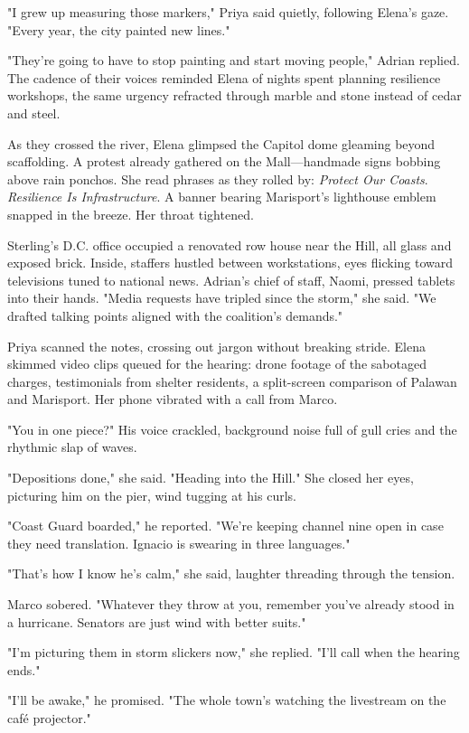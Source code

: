 "I grew up measuring those markers," Priya said quietly, following Elena's gaze. "Every year, the city painted new lines."

"They're going to have to stop painting and start moving people," Adrian replied. The cadence of their voices reminded Elena of nights spent planning resilience workshops, the same urgency refracted through marble and stone instead of cedar and steel.

As they crossed the river, Elena glimpsed the Capitol dome gleaming beyond scaffolding. A protest already gathered on the Mall—handmade signs bobbing above rain ponchos. She read phrases as they rolled by: \textit{Protect Our Coasts}. \textit{Resilience Is Infrastructure}. A banner bearing Marisport's lighthouse emblem snapped in the breeze. Her throat tightened.

Sterling's D.C. office occupied a renovated row house near the Hill, all glass and exposed brick. Inside, staffers hustled between workstations, eyes flicking toward televisions tuned to national news. Adrian's chief of staff, Naomi, pressed tablets into their hands. "Media requests have tripled since the storm," she said. "We drafted talking points aligned with the coalition's demands."

Priya scanned the notes, crossing out jargon without breaking stride. Elena skimmed video clips queued for the hearing: drone footage of the sabotaged charges, testimonials from shelter residents, a split-screen comparison of Palawan and Marisport. Her phone vibrated with a call from Marco.

"You in one piece?" His voice crackled, background noise full of gull cries and the rhythmic slap of waves.

"Depositions done," she said. "Heading into the Hill." She closed her eyes, picturing him on the pier, wind tugging at his curls.

"Coast Guard boarded," he reported. "We're keeping channel nine open in case they need translation. Ignacio is swearing in three languages."

"That's how I know he's calm," she said, laughter threading through the tension.

Marco sobered. "Whatever they throw at you, remember you've already stood in a hurricane. Senators are just wind with better suits."

"I'm picturing them in storm slickers now," she replied. "I'll call when the hearing ends."

"I'll be awake," he promised. "The whole town's watching the livestream on the café projector."


